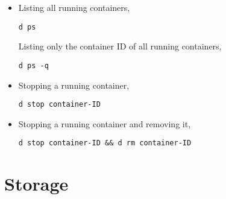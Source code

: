 \documentclass[12pt, a4paper]{scrbook}
\numberwithin{equation}{section}
\theoremstyle{definition}
\theoremstyle{definition}
\begin{document}
	\begin{itemize} 
		
		\item Listing all running containers, 
		
		\begin{lstlisting}[style=mystylebash, label=alg:docker__check_all_contain, xleftmargin=\parindent]
			d ps
		\end{lstlisting}
		
		Listing only the container ID of all running containers,
		
		\begin{lstlisting}[style=mystylebash, label=alg:docker__contains_ids, xleftmargin=\parindent]
			d ps -q
		\end{lstlisting}
		
		\item Stopping a running container,
		
		\begin{lstlisting}[style=mystylebash, label=alg:docker__stop_contain, xleftmargin=\parindent]
			d stop container-ID
		\end{lstlisting}
		
		\item Stopping a running container and removing it,
		
		\begin{lstlisting}[style=mystylebash, label=alg:docker__stop_rem_contain, xleftmargin=\parindent]
			d stop container-ID && d rm container-ID
		\end{lstlisting}
		
	\end{itemize}
	
	\section{Storage}
	
\end{document}
